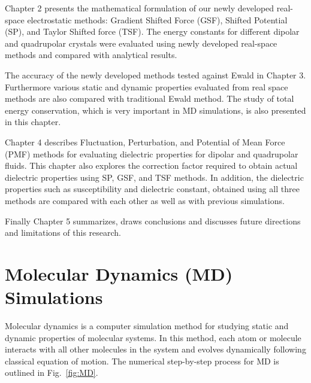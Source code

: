 Chapter 2 presents the mathematical formulation of our newly developed real-space electrostatic methods: Gradient Shifted Force (GSF), Shifted Potential (SP), and Taylor Shifted force (TSF). The energy constants for different dipolar and quadrupolar crystals were evaluated using newly developed real-space methods and compared with analytical results.

The accuracy of the newly developed methods tested against Ewald in Chapter 3. Furthermore various static and dynamic properties evaluated from real space methods are also compared with traditional Ewald method. The study of total energy conservation, which is very important in MD simulations, is also presented in this chapter. 

Chapter 4 describes Fluctuation, Perturbation, and Potential of Mean Force (PMF) methods for evaluating dielectric properties for dipolar and quadrupolar fluids. This chapter also explores the correction factor required to obtain actual dielectric properties using  SP, GSF, and TSF methods. In addition, the dielectric properties such as susceptibility and dielectric constant, obtained using all three methods are compared with each other as well as with previous simulations.

Finally Chapter 5 summarizes, draws conclusions and discusses future directions and limitations of this research. 

\section{Molecular Dynamics (MD) Simulations}

Molecular dynamics is a computer simulation method for studying static and dynamic properties of molecular systems. In this method, each atom or molecule interacts with all other molecules in the system and evolves dynamically following classical equation of motion. The numerical step-by-step process for MD is outlined in Fig.~\ref{fig:MD}. 
    
